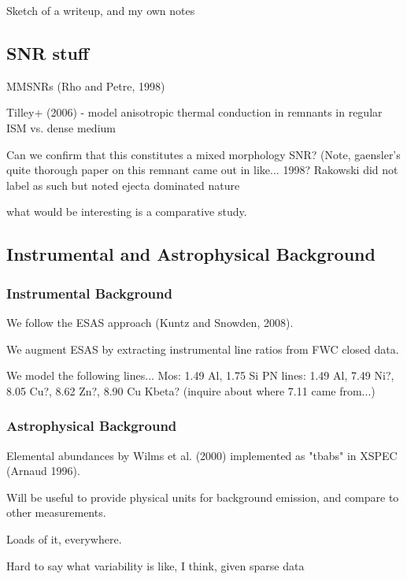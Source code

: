 
Sketch of a writeup, and my own notes

\subsection{SNR stuff}

MMSNRs (Rho and Petre, 1998)

Tilley+ (2006) - model anisotropic thermal conduction in remnants in regular
ISM vs. dense medium


Can we confirm that this constitutes a mixed morphology SNR?
(Note, gaensler's quite thorough paper on this remnant came out in like...
1998?
Rakowski did not label as such but noted ejecta dominated nature

what would be interesting is a comparative study.



\subsection{Instrumental and Astrophysical Background}

\subsubsection{Instrumental Background}

We follow the ESAS approach (Kuntz and Snowden, 2008).

We augment ESAS by extracting instrumental line ratios from FWC closed data.

We model the following lines...
Mos: 1.49 Al, 1.75 Si
PN lines: 1.49 Al, 7.49 Ni?, 8.05 Cu?, 8.62 Zn?, 8.90 Cu Kbeta?
    (inquire about where 7.11 came from...)

\subsubsection{Astrophysical Background}

Elemental abundances by Wilms et al. (2000) implemented as "tbabs" in XSPEC
(Arnaud 1996).

Will be useful to provide physical units for background emission, and compare
to other measurements.


Loads of it, everywhere.


Hard to say what variability is like, I think, given sparse data


